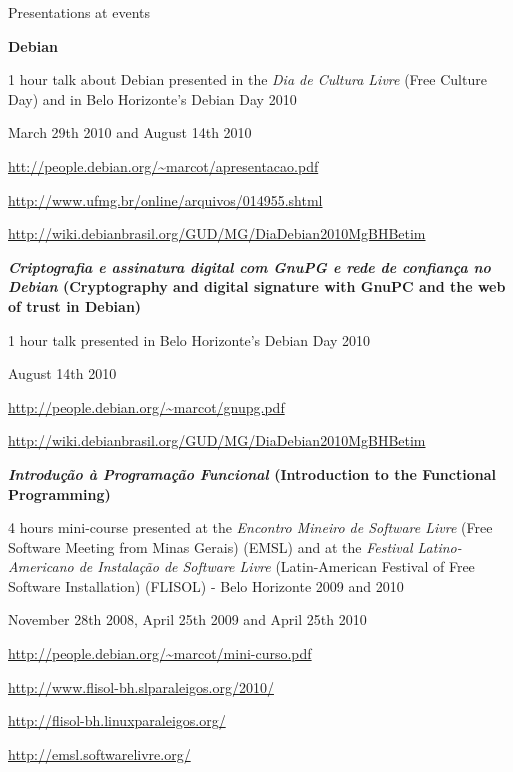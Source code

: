 \begin {rubric} {Presentations at events}

\entry* [Debian]
\textbf{Debian}

1 hour talk about Debian presented in the \emph{Dia de Cultura Livre} (Free
Culture Day) and in Belo Horizonte's Debian Day 2010

March 29th 2010 and August 14th 2010

\url {htt://people.debian.org/~marcot/apresentacao.pdf}

\url {http://www.ufmg.br/online/arquivos/014955.shtml}

\url {http://wiki.debianbrasil.org/GUD/MG/DiaDebian2010MgBHBetim}

\entry* [GPG]
\textbf{\emph{Criptografia e assinatura digital com GnuPG e rede de confiança
    no Debian} (Cryptography and digital signature with GnuPC and the web of
  trust in Debian)}

1 hour talk presented in Belo Horizonte's Debian Day 2010

August 14th 2010

\url {http://people.debian.org/~marcot/gnupg.pdf}

\url {http://wiki.debianbrasil.org/GUD/MG/DiaDebian2010MgBHBetim}

\entry* [Haskell]
\textbf {\emph{Introdução à Programação Funcional} (Introduction to the
  Functional Programming)}

4 hours mini-course presented at the \emph{Encontro Mineiro de Software Livre}
(Free Software Meeting from Minas Gerais) (EMSL) and at the \emph{Festival
  Latino-Americano de Instalação de Software Livre}
(Latin-American Festival of Free Software Installation) (FLISOL) - Belo Horizonte 2009 and 2010

November 28th 2008, April 25th 2009 and April 25th 2010

\url {http://people.debian.org/~marcot/mini-curso.pdf}

\url {http://www.flisol-bh.slparaleigos.org/2010/}

\url {http://flisol-bh.linuxparaleigos.org/}

\url {http://emsl.softwarelivre.org/}

\end {rubric}
